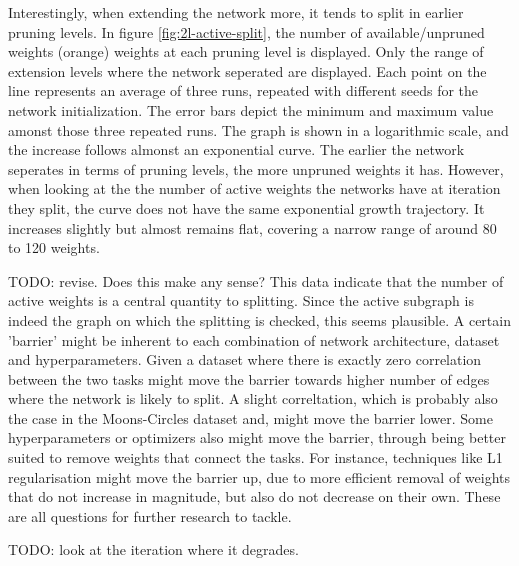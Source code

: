 Interestingly, when extending the network more, it tends to split in earlier pruning levels.
In figure \ref{fig:2l-active-split}, the number of available/unpruned weights (orange) weights at each pruning level is displayed.
Only the range of extension levels where the network seperated are displayed.
Each point on the line represents an average of three runs, repeated with different seeds for the network initialization.
The error bars depict the minimum and maximum value amonst those three repeated runs.
The graph is shown in a logarithmic scale, and the increase follows almonst an exponential curve.
The earlier the network seperates in terms of pruning levels, the more unpruned weights it has.
However, when looking at the the number of active weights the networks have at iteration they split, the curve does not have the same exponential growth trajectory.
It increases slightly but almost remains flat, covering a narrow range of around 80 to 120 weights.

TODO: revise. Does this make any sense?
This data indicate that the number of active weights is a central quantity to splitting.
Since the active subgraph is indeed the graph on which the splitting is checked, this seems plausible.
A certain 'barrier' might be inherent to each combination of network architecture, dataset and hyperparameters.
Given a dataset where there is exactly zero correlation between the two tasks might move the barrier towards higher number of edges where the network is likely to split.
A slight correltation, which is probably also the case in the Moons-Circles dataset and, might move the barrier lower.
Some hyperparameters or optimizers also might move the barrier, through being better suited to remove weights that connect the tasks.
For instance, techniques like L1 regularisation might move the barrier up, due to more efficient removal of weights that do not increase in magnitude, but also do not decrease on their own.
These are all questions for further research to tackle.
 
TODO: look at the iteration where it degrades.

